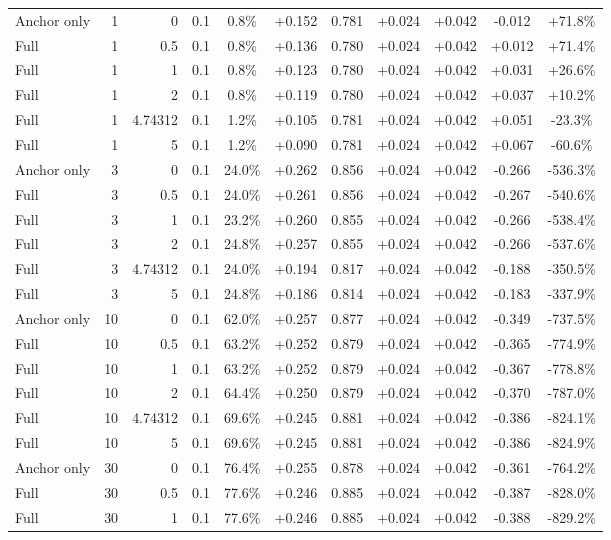 \begin{table}[htbp]
\begin{tabular}{lrrrccccccc}
Anchor only & 1 & 0 & 0.1 & 0.8\% & +0.152 & 0.781 & +0.024 & +0.042 & -0.012 & +71.8\% \\
Full & 1 & 0.5 & 0.1 & 0.8\% & +0.136 & 0.780 & +0.024 & +0.042 & +0.012 & +71.4\% \\
Full & 1 & 1 & 0.1 & 0.8\% & +0.123 & 0.780 & +0.024 & +0.042 & +0.031 & +26.6\% \\
Full & 1 & 2 & 0.1 & 0.8\% & +0.119 & 0.780 & +0.024 & +0.042 & +0.037 & +10.2\% \\
Full & 1 & 4.74312 & 0.1 & 1.2\% & +0.105 & 0.781 & +0.024 & +0.042 & +0.051 & -23.3\% \\
Full & 1 & 5 & 0.1 & 1.2\% & +0.090 & 0.781 & +0.024 & +0.042 & +0.067 & -60.6\% \\
Anchor only & 3 & 0 & 0.1 & 24.0\% & +0.262 & 0.856 & +0.024 & +0.042 & -0.266 & -536.3\% \\
Full & 3 & 0.5 & 0.1 & 24.0\% & +0.261 & 0.856 & +0.024 & +0.042 & -0.267 & -540.6\% \\
Full & 3 & 1 & 0.1 & 23.2\% & +0.260 & 0.855 & +0.024 & +0.042 & -0.266 & -538.4\% \\
Full & 3 & 2 & 0.1 & 24.8\% & +0.257 & 0.855 & +0.024 & +0.042 & -0.266 & -537.6\% \\
Full & 3 & 4.74312 & 0.1 & 24.0\% & +0.194 & 0.817 & +0.024 & +0.042 & -0.188 & -350.5\% \\
Full & 3 & 5 & 0.1 & 24.8\% & +0.186 & 0.814 & +0.024 & +0.042 & -0.183 & -337.9\% \\
Anchor only & 10 & 0 & 0.1 & 62.0\% & +0.257 & 0.877 & +0.024 & +0.042 & -0.349 & -737.5\% \\
Full & 10 & 0.5 & 0.1 & 63.2\% & +0.252 & 0.879 & +0.024 & +0.042 & -0.365 & -774.9\% \\
Full & 10 & 1 & 0.1 & 63.2\% & +0.252 & 0.879 & +0.024 & +0.042 & -0.367 & -778.8\% \\
Full & 10 & 2 & 0.1 & 64.4\% & +0.250 & 0.879 & +0.024 & +0.042 & -0.370 & -787.0\% \\
Full & 10 & 4.74312 & 0.1 & 69.6\% & +0.245 & 0.881 & +0.024 & +0.042 & -0.386 & -824.1\% \\
Full & 10 & 5 & 0.1 & 69.6\% & +0.245 & 0.881 & +0.024 & +0.042 & -0.386 & -824.9\% \\
Anchor only & 30 & 0 & 0.1 & 76.4\% & +0.255 & 0.878 & +0.024 & +0.042 & -0.361 & -764.2\% \\
Full & 30 & 0.5 & 0.1 & 77.6\% & +0.246 & 0.885 & +0.024 & +0.042 & -0.387 & -828.0\% \\
Full & 30 & 1 & 0.1 & 77.6\% & +0.246 & 0.885 & +0.024 & +0.042 & -0.388 & -829.2\% \\

\end{tabular}
\end{table}
